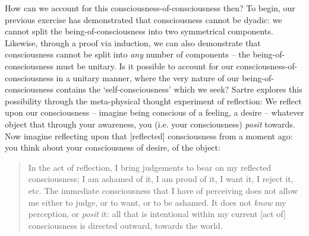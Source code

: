 How can we account for this consciousness-of-consciousness then? To begin, our previous exercise has demonstrated that consciousness cannot be dyadic: we cannot split the being-of-consciousness into two symmetrical components. Likewise, through a proof via induction, we can also demonstrate that consciousness cannot be split into \emph{any} number of components -- the being-of-consciousness must be unitary. Is it possible to account for our consciousness-of-consciousness in a unitary manner, where the very nature of our being-of-consciousness contains the \enquote*{self-consciousness} which we seek? Sartre explores this possibility through the meta-physical thought experiment of reflection: We reflect upon our consciousness -- imagine being conscious of a feeling, a desire -- whatever object that through your awareness, you (i.e. your consciousness) \emph{posit} towards. Now imagine reflecting upon that [reflected] consciousness from a moment ago: you think about your consciousness of desire, of the object:

\blockcquote[11]{Sartre}{%
    In the act of reflection, I bring judgements to bear on my reflected consciousness; I am ashamed of it, I am proud of it, I want it, I reject it, etc. The immediate consciousness that I have of perceiving does not allow me either to judge, or to want, or to be ashamed. It does not \emph{know} my perception, or \emph{posit} it: all that is intentional within my current [act of] consciousness is directed outward, towards the world.
}

